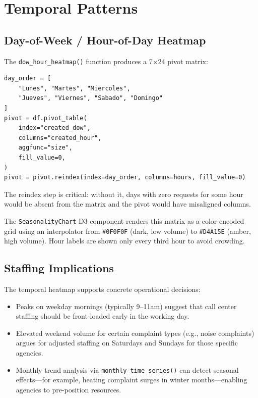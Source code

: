 \section{Temporal Patterns}
\label{sec:ops-temporal}


\subsection{Day-of-Week / Hour-of-Day Heatmap}

The \texttt{dow\_hour\_heatmap()} function produces a 7$\times$24 pivot matrix:

\begin{lstlisting}[style=python, caption={DoW x hour pivot in \texttt{ops\_engine.py}}, label=lst:dow-hour]
day_order = [
    "Lunes", "Martes", "Miercoles",
    "Jueves", "Viernes", "Sabado", "Domingo"
]
pivot = df.pivot_table(
    index="created_dow",
    columns="created_hour",
    aggfunc="size",
    fill_value=0,
)
pivot = pivot.reindex(index=day_order, columns=hours, fill_value=0)
\end{lstlisting}

The reindex step is critical: without it, days with zero requests for some hour would be absent from the matrix and the pivot would have misaligned columns.

The \texttt{SeasonalityChart} D3 component renders this matrix as a color-encoded grid using an interpolator from \texttt{\#0F0F0F} (dark, low volume) to \texttt{\#D4A15E} (amber, high volume). Hour labels are shown only every third hour to avoid crowding.

\subsection{Staffing Implications}

The temporal heatmap supports concrete operational decisions:

\begin{itemize}
  \item Peaks on weekday mornings (typically 9--11am) suggest that call center staffing should be front-loaded early in the working day.
  \item Elevated weekend volume for certain complaint types (e.g., noise complaints) argues for adjusted staffing on Saturdays and Sundays for those specific agencies.
  \item Monthly trend analysis via \texttt{monthly\_time\_series()} can detect seasonal effects---for example, heating complaint surges in winter months---enabling agencies to pre-position resources.
\end{itemize}

